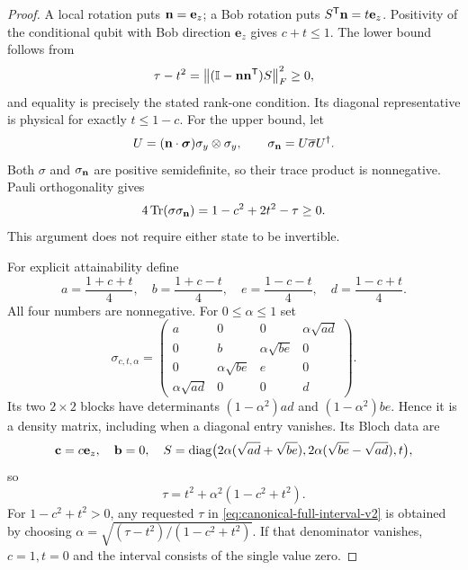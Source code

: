\begin{proof}
A local rotation puts $\mathbf n=\mathbf e_z$; a Bob rotation puts
$S^{\mathsf T}\mathbf n=t\mathbf e_z$. Positivity of the conditional qubit with
Bob direction $\mathbf e_z$ gives $c+t\leq1$. The lower bound follows from
\[
 \tau-t^2=\left\lVert(\mathbb I-\mathbf n\mathbf n^{\mathsf T})S\right\rVert_F^2\geq0,
\]
and equality is precisely the stated rank-one condition. Its diagonal
representative is physical for exactly $t\leq1-c$.
For the upper bound, let
\[
 U=(\mathbf n\cdot\boldsymbol\sigma)\sigma_y\otimes\sigma_y,
 \qquad \sigma_{\mathbf n}=U\overline\sigma U^\dagger.
\]
Both $\sigma$ and $\sigma_{\mathbf n}$ are positive semidefinite, so their trace
product is nonnegative. Pauli orthogonality gives
\[
 4\operatorname{Tr}(\sigma\sigma_{\mathbf n})=1-c^2+2t^2-\tau\geq0.
\]
This argument does not require either state to be invertible.

For explicit attainability define
\[
 a=\frac{1+c+t}{4},\quad b=\frac{1+c-t}{4},\quad
 e=\frac{1-c-t}{4},\quad d=\frac{1-c+t}{4}.
\]
All four numbers are nonnegative. For $0\leq\alpha\leq1$ set
\begin{equation}\label{eq:interval-family-v2}
 \sigma_{c,t,\alpha}=\begin{pmatrix}
 a&0&0&\alpha\sqrt{ad}\\
 0&b&\alpha\sqrt{be}&0\\
 0&\alpha\sqrt{be}&e&0\\
 \alpha\sqrt{ad}&0&0&d
 \end{pmatrix}.
\end{equation}
Its two $2\times2$ blocks have determinants $(1-\alpha^2)ad$ and
$(1-\alpha^2)be$. Hence it is a density matrix, including when a diagonal
entry vanishes. Its Bloch data are
\[
 \mathbf c=c\mathbf e_z,\quad\mathbf b=0,\quad
 S=\operatorname{diag}\bigl(2\alpha(\sqrt{ad}+\sqrt{be}),
                    2\alpha(\sqrt{be}-\sqrt{ad}),t\bigr),
\]
so
\begin{equation}\label{eq:interval-param-v2}
 \tau=t^2+\alpha^2(1-c^2+t^2).
\end{equation}
For $1-c^2+t^2>0$, any requested $\tau$ in
\eqref{eq:canonical-full-interval-v2} is obtained by choosing
$\alpha=\sqrt{(\tau-t^2)/(1-c^2+t^2)}$. If that denominator vanishes,
$c=1,t=0$ and the interval consists of the single value zero.


\end{proof}
